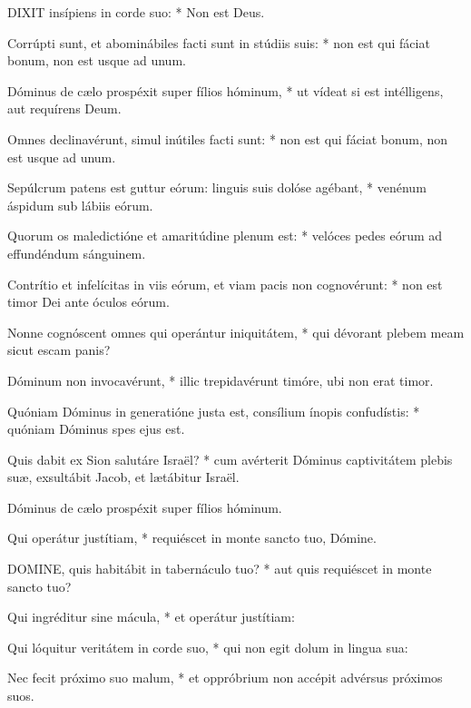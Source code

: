

\lettrine[lines=2]{D}{IXIT} insípiens in corde suo: * Non est Deus.

Corrúpti sunt, et abominábiles facti sunt in stúdiis suis: * non est qui fáciat bonum, non est usque ad unum.

Dóminus de cælo prospéxit super fílios hóminum, * ut vídeat si est intélligens, aut requírens Deum.

Omnes declinavérunt, simul inútiles facti sunt: * non est qui fáciat bonum, non est usque ad unum.

Sepúlcrum patens est guttur eórum: linguis suis dolóse agébant, * venénum áspidum sub lábiis eórum.

Quorum os maledictióne et amaritúdine plenum est: * velóces pedes eórum ad effundéndum sánguinem.

Contrítio et infelícitas in viis eórum, et viam pacis non cognovérunt: * non est timor Dei ante óculos eórum.

Nonne cognóscent omnes qui operántur iniquitátem, * qui dévorant plebem meam sicut escam panis?

Dóminum non invocavérunt, * illic trepidavérunt timóre, ubi non erat timor.

Quóniam Dóminus in generatióne justa est, consílium ínopis confudístis: * quóniam Dóminus spes ejus est.

Quis dabit ex Sion salutáre Israël? * cum avérterit Dóminus captivitátem plebis suæ, exsultábit Jacob, et lætábitur Israël.

 Dóminus de cælo prospéxit super fílios hóminum.

 Qui operátur justítiam, * requiéscet in monte sancto tuo, Dómine.


\lettrine[lines=2]{D}{OMINE}, quis habitábit in tabernáculo tuo? * aut quis requiéscet in monte sancto tuo?

Qui ingréditur sine mácula, * et operátur justítiam:

Qui lóquitur veritátem in corde suo, * qui non egit dolum in lingua sua:

Nec fecit próximo suo malum, * et oppróbrium non accépit advérsus próximos suos.

